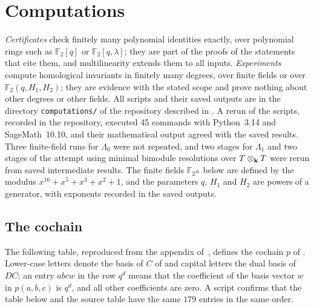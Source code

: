 \section{Computations}
\label{app:computations}

\emph{Certificates} check finitely many polynomial identities exactly,
over polynomial rings such as $\mathbb{F}_2[q]$ or $\mathbb{F}_2[q,\lambda]$;
they are part of the proofs of the statements that cite them, and
multilinearity extends them to all inputs. \emph{Experiments} compute
homological invariants in finitely many degrees, over finite fields or over
$\mathbb{F}_2(q,H_1,H_2)$; they are evidence with the stated scope and prove
nothing about other degrees or other fields. All scripts and their saved
outputs are in the directory \texttt{computations/} of the repository described
in . A rerun of the
scripts, recorded in the repository, executed 45 commands with Python~3.14 and
SageMath~10.10, and their mathematical output agreed with the saved results.
Three finite-field runs for $\Lambda_0$ were not repeated, and two stages for
$\Lambda_1$ and two stages of the attempt using minimal bimodule resolutions
over ${T\otimes_{\mathbf{k}} T}$ were rerun from
saved intermediate results. The finite fields
$\mathbb{F}_{2^{16}}$ below are defined by the modulus
${x^{16}+x^5+x^3+x^2+1}$, and the parameters $q$, $H_1$ and $H_2$ are powers of a
generator, with exponents recorded in the saved outputs.

\subsection*{The cochain}

The following table, reproduced from the appendix of~\cite{OAI26ar}, defines the
cochain $p$ of . Lower-case letters denote the basis of $C$
of  and capital letters the dual basis of $DC$; an entry
$abcw$ in the row $q^d$ means that the coefficient of the basis vector $w$ in
$p(a,b,c)$ is $q^d$, and all other coefficients are zero. A script confirms that
the table below and the source table have the same $179$ entries
in the same order.

